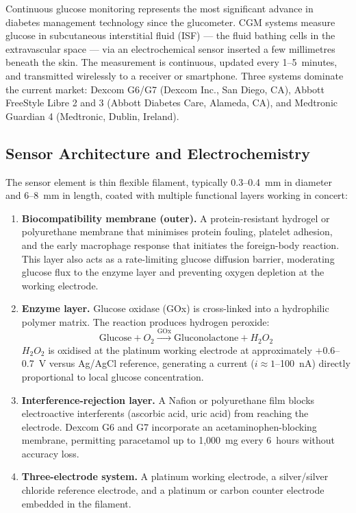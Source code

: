 Continuous glucose monitoring represents the most significant advance in diabetes management technology since the glucometer. CGM systems measure glucose in subcutaneous interstitial fluid (ISF) --- the fluid bathing cells in the extravascular space --- via an electrochemical sensor inserted a few millimetres beneath the skin. The measurement is continuous, updated every 1--5~minutes, and transmitted wirelessly to a receiver or smartphone. Three systems dominate the current market: Dexcom G6/G7 (Dexcom Inc., San Diego, CA), Abbott FreeStyle Libre 2 and 3 (Abbott Diabetes Care, Alameda, CA), and Medtronic Guardian 4 (Medtronic, Dublin, Ireland).

\subsection*{Sensor Architecture and Electrochemistry}

The sensor element is thin flexible filament, typically 0.3--0.4~mm in diameter and 6--8~mm in length, coated with multiple functional layers working in concert:

\begin{enumerate}
  \item \textbf{Biocompatibility membrane (outer).} A protein-resistant hydrogel or polyurethane membrane that minimises protein fouling, platelet adhesion, and the early macrophage response that initiates the foreign-body reaction. This layer also acts as a rate-limiting glucose diffusion barrier, moderating glucose flux to the enzyme layer and preventing oxygen depletion at the working electrode.
  \item \textbf{Enzyme layer.} Glucose oxidase (GOx) is cross-linked into a hydrophilic polymer matrix. The reaction produces hydrogen peroxide:
  \[
    \text{Glucose} + O_2 \xrightarrow{\text{GOx}} \text{Gluconolactone} + H_2O_2
  \]
  $H_2O_2$ is oxidised at the platinum working electrode at approximately $+$0.6--0.7~V versus Ag/AgCl reference, generating a current ($i \approx 1$--100~nA) directly proportional to local glucose concentration.
  \item \textbf{Interference-rejection layer.} A Nafion or polyurethane film blocks electroactive interferents (ascorbic acid, uric acid) from reaching the electrode. Dexcom G6 and G7 incorporate an acetaminophen-blocking membrane, permitting paracetamol up to 1,000~mg every 6~hours without accuracy loss.
  \item \textbf{Three-electrode system.} A platinum working electrode, a silver/silver chloride reference electrode, and a platinum or carbon counter electrode embedded in the filament.
\end{enumerate}

